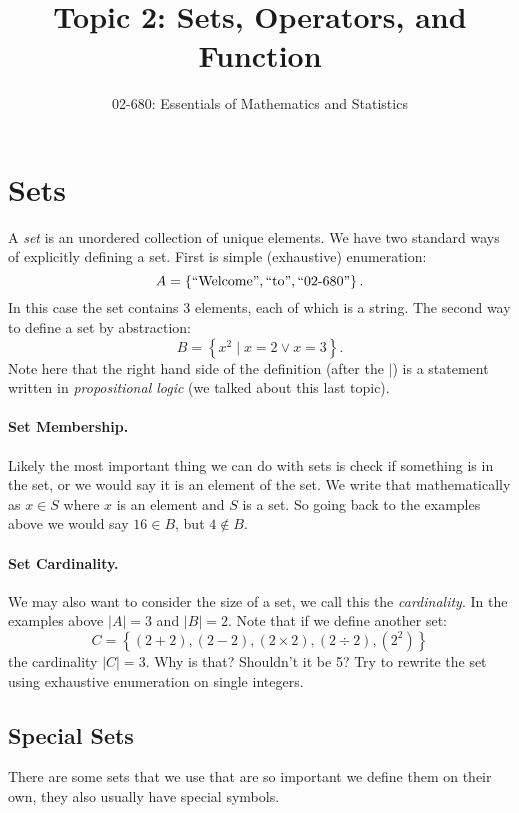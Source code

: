 


\title{Topic 2: Sets, Operators, and Function}
\author{02-680: Essentials of Mathematics and Statistics}


\maketitle

\section{Sets}
A \emph{set} is an unordered collection of unique elements. 
We have two standard ways of explicitly defining a set. 
First is simple (exhaustive) enumeration:
\[
A = \left\{\textnormal{``Welcome''}, \textnormal{``to''}, \textnormal{``02-680''}\right\}.
\]
In this case the set contains 3 elements, each of which is a string.
The second way to define a set by abstraction:
\[
B = \left\{x^2 \mid x=2 \vee x=3 \right\}.
\]
Note here that the right hand side of the definition (after the $\mid$) is a statement written in \emph{propositional logic} (we talked about this last topic).

\paragraph{Set Membership.} Likely the most important thing we can do with sets is check if something is in the set, 
or we would say it is an element of the set. 
We write that mathematically as $x \in S$ where $x$ is an element and $S$ is a set. 
So going back to the examples above we would say $16 \in B$, but $4 \notin B$.

\paragraph{Set Cardinality.} 
We may also want to consider the size of a set, we call this the \emph{cardinality}.
In the examples above $|A|=3$ and $|B| = 2$.
Note that if we define another set:
\[
C = \left\{ \left(2+2\right), \left(2-2\right), \left(2\times2\right), \left(2\div2\right), \left(2^2\right) \right\}
\]
the cardinality $|C|=3$. 
Why is that? Shouldn't it be 5? 
Try to rewrite the set using exhaustive enumeration on single integers.

\subsection{Special Sets}
There are some sets that we use that are so important we define them on their own, they also usually have special symbols. 

